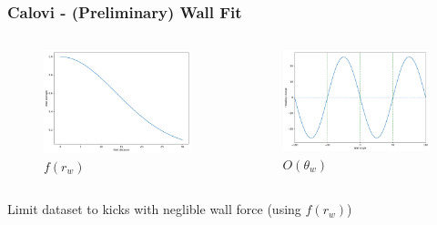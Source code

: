\documentclass{beamer}
\begin{document}
\begin{frame}
  \frametitle{Calovi - (Preliminary) Wall Fit}
 \begin{columns}
   \begin{column}{0.5\textwidth}
     \begin{figure}[h]
       \centering
\includegraphics[clip, width=1\linewidth]{wall_force.pdf}
       \caption*{$f(r_w)$}
     \end{figure}
   \end{column}
   
   \begin{column}{0.5\textwidth}
     \begin{figure}[h]
       \centering
\includegraphics[clip, width=1\linewidth]{wall_odd.pdf}
       \caption*{$O(\theta_w)$}
     \end{figure}
   \end{column}
\end{columns}
Limit dataset to kicks with neglible wall force (using $f(r_w)$)
\end{frame}
\end{document}
